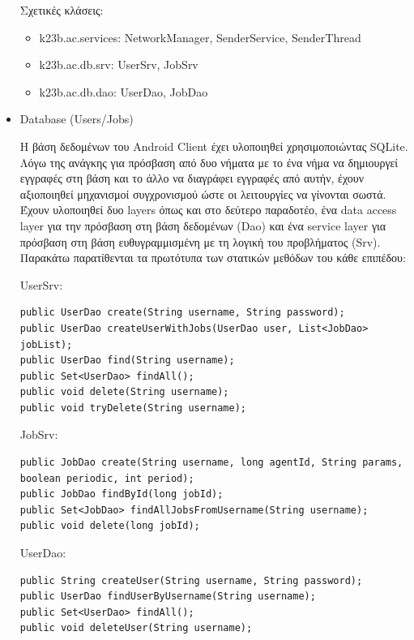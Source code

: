 \documentclass[a4paper,11pt]{article}
\begin{document}
\begin{sloppypar}
\begin{itemize}
Σχετικές κλάσεις:

\begin{itemize}

\item k23b.ac.services: NetworkManager, SenderService, SenderThread

\item k23b.ac.db.srv: UserSrv, JobSrv

\item k23b.ac.db.dao: UserDao, JobDao

\end{itemize}

\item{Database (Users/Jobs)}

Η βάση δεδομένων του Android Client έχει υλοποιηθεί χρησιμοποιώντας SQLite. Λόγω της ανάγκης για πρόσβαση από δυο νήματα με το ένα νήμα να δημιουργεί εγγραφές στη βάση και το άλλο να διαγράφει εγγραφές από αυτήν, έχουν αξιοποιηθεί μηχανισμοί συγχρονισμού ώστε οι λειτουργίες να γίνονται σωστά. Έχουν υλοποιηθεί δυο layers όπως και στο δεύτερο παραδοτέο, ένα data access layer για την πρόσβαση στη βάση δεδομένων (Dao) και ένα service layer για πρόσβαση στη βάση ευθυγραμμισμένη με τη λογική του προβλήματος (Srv). 
\newpage
Παρακάτω παρατίθενται τα πρωτότυπα των στατικών μεθόδων του κάθε επιπέδου:

UserSrv:
\begin{lstlisting}
public UserDao create(String username, String password);
public UserDao createUserWithJobs(UserDao user, List<JobDao> jobList);
public UserDao find(String username);
public Set<UserDao> findAll();
public void delete(String username);
public void tryDelete(String username);

\end{lstlisting}

JobSrv:
\begin{lstlisting}
public JobDao create(String username, long agentId, String params, boolean periodic, int period);
public JobDao findById(long jobId);
public Set<JobDao> findAllJobsFromUsername(String username);
public void delete(long jobId);

\end{lstlisting}

UserDao:

\begin{lstlisting}
public String createUser(String username, String password);
public UserDao findUserByUsername(String username);
public Set<UserDao> findAll();
public void deleteUser(String username);


\end{lstlisting}
\end{itemize}
\end{sloppypar}
\end{document}
